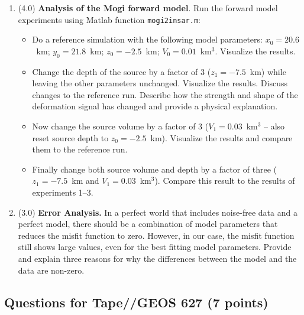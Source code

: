 \documentclass[11pt,titlepage,fleqn]{article}
\begin{document}
\begin{enumerate}
\item (4.0) {\bf Analysis of the Mogi forward model}. Run the forward model experiments using Matlab function \verb+mogi2insar.m+:
\begin{itemize}
\item Do a reference simulation with the following model parameters: $x_0 = 20.6$~km; $y_0 = 21.8$~km; $z_0 = -2.5$~km; $V_0 = 0.01$~km$^3$. Visualize the results.
\item Change the depth of the source by a factor of 3 ($z_1 = -7.5$~km) while leaving the other parameters unchanged. Visualize the results. Discuss changes to the reference run. Describe how the strength and shape of the deformation signal has changed and provide a physical explanation.
\item Now change the source volume by a factor of 3 ($V_1 = 0.03$~km$^3$ -- also reset source depth to $z_0 = -2.5$~km). Visualize the results and compare them to the reference run.
\item Finally change both source volume and depth by a factor of three ($z_1 = -7.5$~km and $V_1 = 0.03$~km$^3$). Compare this result to the results of experiments 1--3.
\end{itemize}

\item (3.0) {\bf Error Analysis.} In a perfect world that includes noise-free data and a perfect model, there should be a combination of model parameters that reduces the misfit function to zero. However, in our case, the misfit function still shows large values, even for the best fitting model parameters. Provide and explain three reasons for why the differences between the model and the data are non-zero.
\end{enumerate}


\pagebreak
\subsection*{Questions for Tape//GEOS 627 (7 points)}
\end{document}
